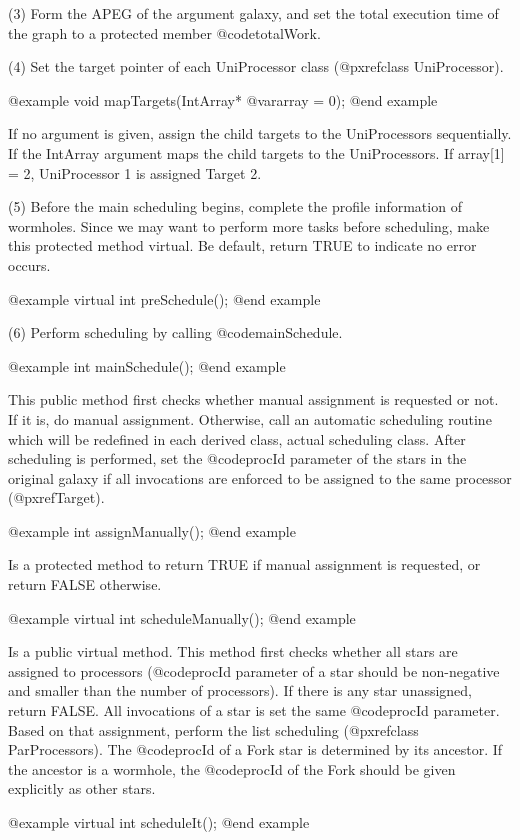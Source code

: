 (3) Form the APEG of the argument galaxy, and set the total execution time
of the graph to a protected member @code{totalWork}.

(4) Set the target pointer of each UniProcessor class
(@pxref{class UniProcessor}).

@example
void mapTargets(IntArray* @var{array} = 0);
@end example

If no argument is given, assign the child targets to the UniProcessors
sequentially. If the IntArray argument maps the child targets to the
UniProcessors. If array[1] = 2, UniProcessor 1 is assigned Target 2.

(5) Before the main scheduling begins, complete the profile information of
wormholes. Since we may want to perform more tasks before scheduling, make
this protected method virtual. Be default, return TRUE to indicate no error
occurs.

@example
virtual int preSchedule();
@end example

(6) Perform scheduling by calling @code{mainSchedule}.

@example 
int mainSchedule();
@end example

This public method first checks whether manual assignment is requested or not.
If it is, do manual assignment. Otherwise, call an automatic scheduling 
routine which will be redefined in each derived class, actual scheduling
class. After scheduling is performed, set the @code{procId} parameter of
the stars in the original galaxy if all invocations are enforced to be
assigned to the same processor (@pxref{Target}).

@example
int assignManually();
@end example

Is a protected method to return TRUE if manual assignment is requested, or
return FALSE otherwise.

@example
virtual int scheduleManually();
@end example

Is a public virtual method. This method first checks whether all stars
are assigned to processors (@code{procId} parameter of a star should be
non-negative and smaller than the number of processors). If there is any
star unassigned, return FALSE. All invocations of a star is set the same
@code{procId} parameter. Based on that assignment, perform the
list scheduling (@pxref{class ParProcessors}). The @code{procId} of a Fork
star is determined by its ancestor. If the ancestor is a wormhole, the
@code{procId} of the Fork should be given explicitly as other stars.

@example
virtual int scheduleIt();
@end example

